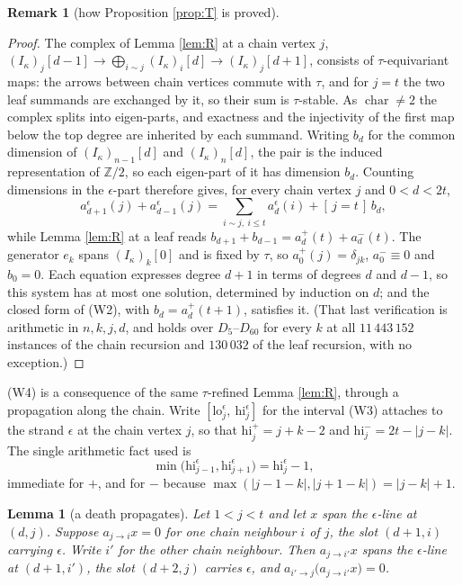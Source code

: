 \documentclass[11pt,reqno]{amsart}
\theoremstyle{plain}
\newtheorem{lemma}[theorem]{Lemma}
\theoremstyle{definition}
\newtheorem{remark}[theorem]{Remark}
\newcommand{\ka}{\kappa}
\begin{document}
\begin{remark}[how Proposition \ref{prop:T} is proved]
\begin{proof}
The complex of Lemma \ref{lem:R} at a chain vertex $j$,
$(I_\ka)_j[d-1]\to\bigoplus_{i\sim j}(I_\ka)_i[d]\to(I_\ka)_j[d+1]$, consists of
$\tau$-equivariant maps: the arrows between chain vertices commute with $\tau$,
and for $j=t$ the two leaf summands are exchanged by it, so their sum is
$\tau$-stable.  As $\operatorname{char}\ne2$ the complex splits into
eigen-parts, and exactness and the injectivity of the first map below the top
degree are inherited by each summand.  Writing $b_d$ for the common dimension of
$(I_\ka)_{n-1}[d]$ and $(I_\ka)_n[d]$, the pair is the induced representation of
$\mathbb{Z}/2$, so each eigen-part of it has dimension $b_d$.  Counting
dimensions in the $\epsilon$-part therefore gives, for every chain vertex $j$ and
$0<d<2t$,
\[
   a^{\epsilon}_{d+1}(j)+a^{\epsilon}_{d-1}(j)
   =\sum_{i\sim j,\ i\le t}a^{\epsilon}_d(i)+[\,j=t\,]\,b_d ,
\]
while Lemma \ref{lem:R} at a leaf reads
$b_{d+1}+b_{d-1}=a^{+}_d(t)+a^{-}_d(t)$.  The generator $e_k$ spans
$(I_\ka)_k[0]$ and is fixed by $\tau$, so $a^{+}_0(j)=\delta_{jk}$,
$a^{-}_0\equiv0$ and $b_0=0$.  Each equation expresses degree $d+1$ in terms of
degrees $d$ and $d-1$, so this system has at most one solution, determined by
induction on $d$; and the closed form of (W2), with $b_d=a^{+}_d(t+1)$, satisfies
it.  (That last verification is arithmetic in $n,k,j,d$, and holds over
$D_5$--$D_{60}$ for every $k$ at all $11\,443\,152$ instances of the chain
recursion and $130\,032$ of the leaf recursion, with no exception.)
\end{proof}

(W4) is a consequence of the same $\tau$-refined Lemma \ref{lem:R}, through a
propagation along the chain.  Write $[\mathrm{lo}^{\epsilon}_j,\
\mathrm{hi}^{\epsilon}_j]$ for the interval (W3) attaches to the strand
$\epsilon$ at the chain vertex $j$, so that
$\mathrm{hi}^{+}_j=j+k-2$ and $\mathrm{hi}^{-}_j=2t-|j-k|$.  The single
arithmetic fact used is
\begin{equation}\label{eq:hi}
   \min\bigl(\mathrm{hi}^{\epsilon}_{j-1},\mathrm{hi}^{\epsilon}_{j+1}\bigr)
   =\mathrm{hi}^{\epsilon}_j-1 ,
\end{equation}
immediate for $+$, and for $-$ because
$\max(|j-1-k|,|j+1-k|)=|j-k|+1$.

\begin{lemma}[a death propagates]\label{lem:death}
Let $1<j<t$ and let $x$ span the $\epsilon$-line at $(d,j)$.  Suppose
$a_{j\to i}x=0$ for one chain neighbour $i$ of $j$, the slot $(d+1,i)$ carrying
$\epsilon$.  Write $i'$ for the other chain neighbour.  Then $a_{j\to i'}x$
spans the $\epsilon$-line at $(d+1,i')$, the slot $(d+2,j)$ carries $\epsilon$,
and $a_{i'\to j}\bigl(a_{j\to i'}x\bigr)=0$.
\end{lemma}


\end{remark}
\end{document}
